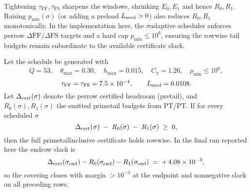 \documentclass[11pt]{article}
\theoremstyle{definition}
\theoremstyle{remark}
\begin{document}
\begin{ptremark}
Tightening $\tau_{\mathrm{FF}},\tau_{\mathrm{FS}}$ sharpens the windows,
shrinking $E_0,E_1$ and hence $R_0,R_1$. Raising $p_{\min}(\sigma)$
(or adding a preload $L_{\rm seed}>0$) also reduces $R_0,R_1$ monotonically.
In the implementation here, the $\sigma$\textendash adaptive scheduler enforces
per\textendash row $\Delta\mathrm{FF}/\Delta\mathrm{FS}$ targets and a hard cap
$p_{\min}\le10^{6}$, ensuring the row\textendash wise tail budgets remain subordinate
to the available certificate slack.
\end{ptremark}

\begin{ptcor}\label{cor:PT-certificate}
Let the schedule be generated with
\[
Q=53,\quad \theta_{\max}=0.30,\quad h_{\max}=0.015,\quad
C_{\pi}=1.26,\quad p_{\min}\le 10^{6},
\]
\[
\tau_{\mathrm{FF}}=\tau_{\mathrm{FS}}=7.5\times10^{-4},\qquad
L_{\rm seed}=0.0108.
\]
Let $\Delta_{\rm cert}(\sigma)$ denote the per\textendash row certified headroom
(pre\textendash tail), and $R_{0}(\sigma),R_{1}(\sigma)$ the emitted prime\textendash tail
budgets from PT/PT. If for every scheduled $\sigma$
\[
\Delta_{\rm cert}(\sigma)\;-
\;R_{0}(\sigma)\;-
\;R_{1}(\sigma)\;\ge\;0,
\]
then the full prime\textendash tail\textendash inclusive certificate holds row\textendash wise.
In the final run reported here the end\textendash row slack is
\[
\Delta_{\rm cert}(\sigma_{\rm end})-R_{0}(\sigma_{\rm end})-R_{1}(\sigma_{\rm end})
\;=\; +\,4.08\times10^{-3},
\]
so the covering closes with margin $>\!10^{-3}$ at the endpoint and
non\textendash negative slack on all preceding rows.
\end{ptcor}



\end{document}
